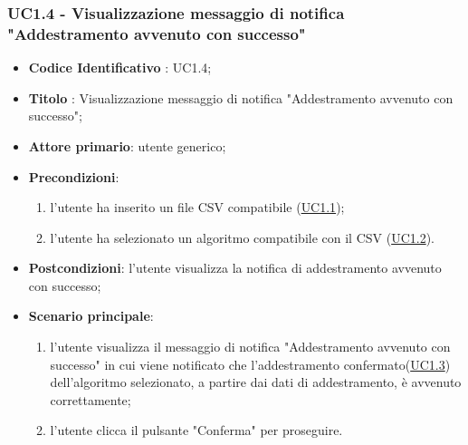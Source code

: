 	\subsubsection{UC1.4 - Visualizzazione messaggio di notifica "Addestramento avvenuto con successo"}
		\begin{itemize}
			\item\textbf{Codice Identificativo} : UC1.4;
			\item\textbf{Titolo} : Visualizzazione messaggio di notifica "Addestramento avvenuto con successo";
			\item\textbf{Attore primario}: utente generico;
			\item\textbf{Precondizioni}: 
				\begin{enumerate}
					\item l'utente ha inserito un file CSV compatibile (\hyperref[par:UC1.1]{UC1.1});
					\item l'utente ha selezionato un algoritmo compatibile con il CSV  (\hyperref[par:UC1.2]{UC1.2}).
				\end{enumerate}
			\item\textbf{Postcondizioni}: l'utente visualizza la notifica di addestramento avvenuto con successo;					
			\item\textbf{Scenario principale}:
				\begin{enumerate}
					\item l'utente visualizza il messaggio di notifica "Addestramento avvenuto con successo" in cui viene notificato che l'addestramento confermato(\hyperref[par:UC1.3]{UC1.3}) dell'algoritmo selezionato, a partire dai dati di addestramento, è avvenuto correttamente;
					\item l'utente clicca il pulsante "Conferma" per proseguire.		
				\end{enumerate}		
		\end{itemize}
		
	\label{par:UC1.5}
